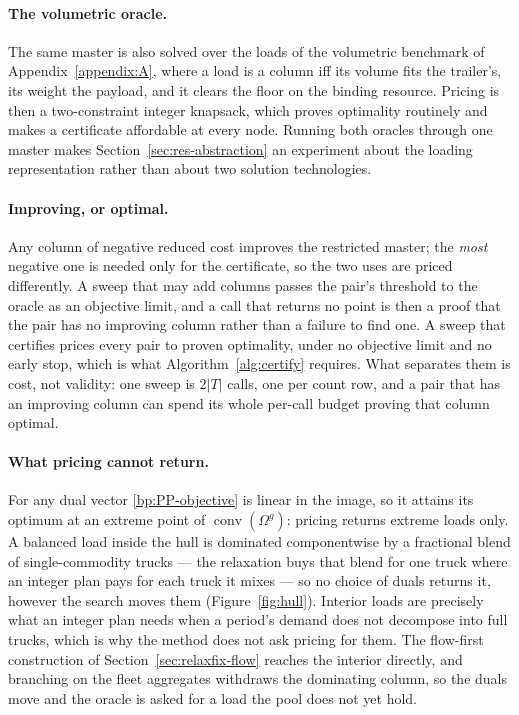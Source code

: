\paragraph{The volumetric oracle.}
The same master is also solved over the loads of the volumetric
benchmark of Appendix~\ref{appendix:A}, where a load is a column iff
its volume fits the trailer's, its weight the payload, and it clears
the floor on the binding resource. Pricing is then a two-constraint
integer knapsack, which proves optimality routinely and makes a
certificate affordable at every node. Running both oracles through one
master makes Section~\ref{sec:res-abstraction} an experiment about the
loading representation rather than about two solution technologies.

\paragraph{Improving, or optimal.}
Any column of negative reduced cost improves the restricted master; the
\emph{most} negative one is needed only for the certificate, so the two
uses are priced differently. A sweep that may add columns passes the
pair's threshold to the oracle as an objective limit, and a call that
returns no point is then a proof that the pair has no improving column
rather than a failure to find one. A sweep that certifies prices every
pair to proven optimality, under no objective limit and no early stop,
which is what Algorithm~\ref{alg:certify} requires. What separates them
is cost, not validity: one sweep is $2|T|$ calls, one per count row, and
a pair that has an improving column can spend its whole per-call budget
proving that column optimal.



\paragraph{What pricing cannot return.}
For any dual vector \eqref{bp:PP-objective} is linear in the image, so
it attains its optimum at an extreme point of
$\operatorname{conv}(\Omega^{g})$: pricing returns extreme loads only.
A balanced load inside the hull is dominated componentwise by a
fractional blend of single-commodity trucks --- the relaxation buys
that blend for one truck where an integer plan pays for each truck it
mixes --- so no choice of duals returns it, however the search moves
them (Figure~\ref{fig:hull}). Interior loads are precisely what an
integer plan needs when a period's demand does not decompose into full
trucks, which is why the method does not ask pricing for them. The
flow-first construction of Section~\ref{sec:relaxfix-flow} reaches the
interior directly, and branching on the fleet aggregates withdraws the
dominating column, so the duals move and the oracle is asked for a load
the pool does not yet hold.


